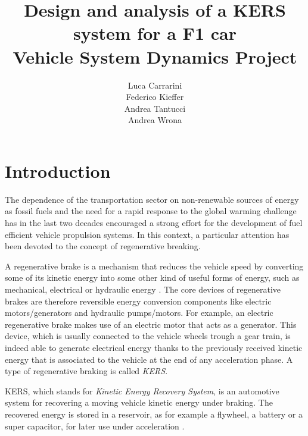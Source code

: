 \documentclass[11pt]{article}
\begin{document}
\title{\textcolor{sapred}{Design and analysis of a KERS system for a F1 car}\\\small{Vehicle System Dynamics Project}}
\author{Luca Carrarini\\Federico Kieffer\\Andrea Tantucci\\Andrea Wrona}
\maketitle

\thispagestyle{empty}

\tableofcontents
\newpage

\section{Introduction}

The dependence of the transportation sector on non-renewable sources of energy as fossil fuels and the need for a rapid response to the global warming challenge has in the last two decades encouraged a strong effort for the development of fuel efficient vehicle propulsion systems. In this context, a particular attention has been devoted to the concept of regenerative breaking. 

A regenerative brake is a mechanism that reduces the vehicle speed by converting some of its kinetic energy into some other kind of useful forms of energy, such as mechanical, electrical or hydraulic energy \cite{a}. The core devices of regenerative brakes are therefore reversible energy conversion components like electric motors/generators and hydraulic pumps/motors. For example, an electric regenerative brake makes use of an electric motor that acts as a generator. This device, which is usually connected to the vehicle wheels trough a gear train, is indeed able to generate electrical energy thanks to the previously received kinetic energy that is associated to the vehicle at the end of any acceleration phase. 
A type of regenerative braking is called \textit{KERS}. 

KERS, which stands for \textit{Kinetic Energy Recovery System}, is an automotive system for recovering a moving vehicle kinetic energy under braking. The recovered energy is stored in a reservoir, as for example a flywheel, a battery or a super capacitor, for later use under acceleration \cite{b}. 
\end{document}
